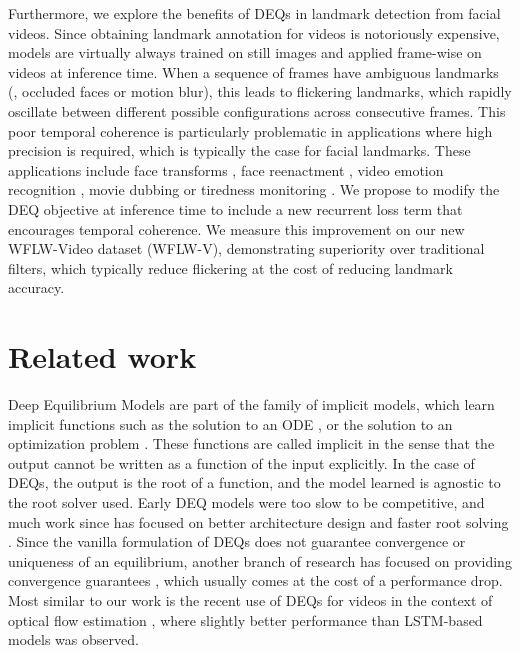 \documentclass[10pt,twocolumn,letterpaper]{article}
\begin{document}
Furthermore, we explore the benefits of DEQs in landmark detection from facial videos. Since obtaining landmark annotation for videos is notoriously expensive, models are virtually always trained on still images and applied frame-wise on videos at inference time. When a sequence of frames have ambiguous landmarks (\eg, occluded faces or motion blur), this leads to flickering landmarks, which rapidly oscillate between different possible configurations across consecutive frames. This poor temporal coherence is particularly problematic in applications where high precision is required, which is typically the case for facial landmarks. These applications include face transforms \cite{MediaPipeGoogleBlog, MediaPipeGoogleBlog3D},  face reenactment \cite{Zhang2019FReeNetFaceReenactment}, video emotion recognition \cite{Jung2015FaceExpressionLandmarkTrajectory , Kim2017MultiModalEmotionRecognition, Yan2016MultiClueFusion, Hasani2017EnhancedDeep3DCNNs}, movie dubbing \cite{Garrido2015DubbingAudioTracks} or tiredness monitoring \cite{Jabbar2020DriverTiredness}. We propose to modify the DEQ objective at inference time to include a new recurrent loss term that encourages temporal coherence. We measure this improvement on our new WFLW-Video dataset (WFLW-V), demonstrating superiority over traditional filters, which typically reduce flickering at the cost of reducing landmark accuracy. 

\section{Related work}
\label{sec:related_work}


Deep Equilibrium Models \cite{Bai2019DEQs} are part of the family of implicit models, which learn implicit functions such as the solution to an ODE \cite{Ricky2018NeuralODEs, Dupont2019AugmentedNeuralODEs}, or the solution to an optimization problem \cite{Amos2017Optnet, Djolonga2017DifferentiableLearningSubmodularModels, Wang2019Satnet}. These functions are called implicit in the sense that the output cannot be written as a function of the input explicitly. In the case of DEQs, the output is the root of a function, and the model learned is agnostic to the root solver used. Early DEQ models were too slow to be competitive, and much work since has focused on better architecture design \cite{Bai2020MDEQs} and faster root solving \cite{Bai2021DEQJacobianRegularization, Fung2021JacobianFreeBackprop, Zhengyang2021OnTrainingImplicitModels}. Since the vanilla formulation of DEQs does not guarantee convergence or uniqueness of an equilibrium, another branch of research has focused on providing convergence guarantees \cite{Winston2020MonotoneOperatorDEQs, Revay2020LipschitzBoundedDEQs, Pabbaraju2021EstimatingLipschitzConstantsOfDEQs}, which usually comes at the cost of a performance drop. Most similar to our work is the recent use of DEQs for videos in the context of optical flow estimation \cite{Bai2022DeqFlow}, where slightly better performance than LSTM-based models was observed.
\end{document}
